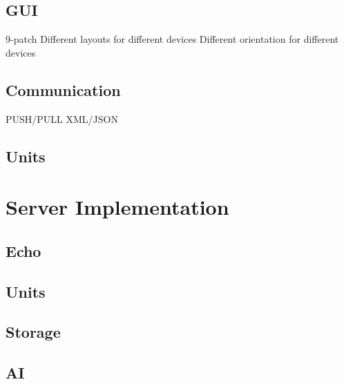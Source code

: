 \subsection{GUI}
9-patch
Different layouts for different devices
Different orientation for different devices


\subsection{Communication}
PUSH/PULL
XML/JSON

\subsection{Units}



\section{Server Implementation}

\subsection{Echo}

\subsection{Units}

\subsection{Storage}

\subsection{AI}
